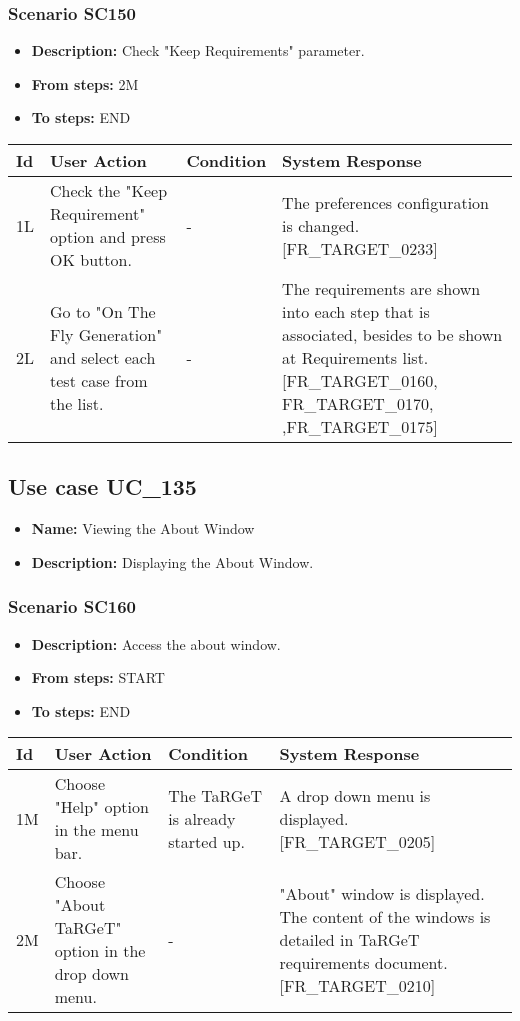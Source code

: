 \documentclass[a4paper,11pt]{article}
\newcommand{\bl}{\\ \hline}
\begin{document}
\subsubsection*{Scenario SC150}
\begin{itemize}
\item {\bf Description:} Check "Keep Requirements" parameter.
\item {\bf From steps:} 2M
\item {\bf To steps:} END
\end{itemize}
\begin{tabular}{|p{0.4in}|p{1.5in}|p{1.5in}|p{1.5in}|}
\hline
Id & User Action & Condition & System Response \bl 
1L & Check the "Keep Requirement" option and press OK button.
					 & - & The preferences configuration is changed.[FR_TARGET_0233]
					\bl
2L & Go to "On The Fly Generation" and select each test case
						from the list. & - & The requirements are shown into each step that is
						associated, besides to be shown at Requirements list.
						[FR_TARGET_0160, FR_TARGET_0170, ,FR_TARGET_0175]\bl
\end{tabular}
\subsection*{Use case UC_135}
\begin{itemize}
\item {\bf Name: }Viewing the About Window
\item {\bf Description: }Displaying the About Window.
\end{itemize}
\subsubsection*{Scenario SC160}
\begin{itemize}
\item {\bf Description:} Access the about window.
\item {\bf From steps:} START
\item {\bf To steps:} END
\end{itemize}
\begin{tabular}{|p{0.4in}|p{1.5in}|p{1.5in}|p{1.5in}|}
\hline
Id & User Action & Condition & System Response \bl 
1M & Choose "Help" option in the menu bar.  & The TaRGeT is already started up. & A drop down menu is displayed. [FR_TARGET_0205]
					\bl
2M & Choose "About TaRGeT" option in the drop down menu.
					 & - & "About" window is displayed. The content of the windows
						is detailed in TaRGeT requirements document. [FR_TARGET_0210]
					\bl
\end{tabular}
\end{document}
